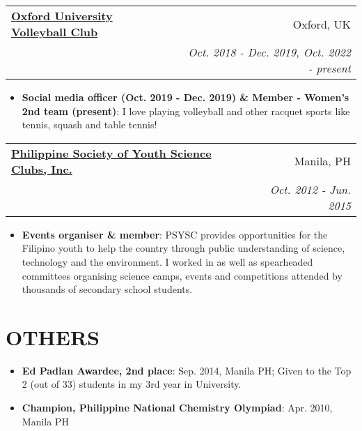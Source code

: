 \documentclass[legalpaper,11pt]{article}
\makeatletter
\newcommand{\resumeItem}[2]{
  \item\small{
    \textbf{#1}{: #2 \vspace{-2pt}}
  }
}
\newcommand{\resumeSubheading}[4]{
  \vspace{-1pt}\item
    \begin{tabular*}{0.97\textwidth}[t]{l@{\extracolsep{\fill}}r}
      \textbf{#1} & #2 \\
      \textit{\small#3} & \textit{\small #4} \\
    \end{tabular*}\vspace{-5pt}
}
\newcommand{\resumeSubItem}[2]{\resumeItem{#1}{#2}\vspace{-4pt}}
\newcommand{\resumeSubHeadingListStart}{\begin{itemize}[leftmargin=*]}
\newcommand{\resumeSubHeadingListEnd}{\end{itemize}}
\newcommand{\resumeItemListStart}{\begin{itemize}}
\newcommand{\resumeItemListEnd}{\end{itemize}\vspace{-5pt}}
\makeatother
\begin{document}
    \resumeSubheading
      {\href{https://ouvc.notion.site/ouvc/OUVC-Homepage-1d969e57c26c4426afc33d509b8736ca}{Oxford University Volleyball Club}}{Oxford, UK}
      {}{Oct. 2018 - Dec. 2019, Oct. 2022 - present}
      \resumeItemListStart
        \resumeItem{Social media officer (Oct. 2019 - Dec. 2019) \& Member - Women's 2nd team (present)}{I love playing volleyball and other racquet sports like tennis, squash and table tennis!}
     \resumeItemListEnd
     
  \resumeSubheading
      {\href{https://psysc.org/}{Philippine Society of Youth Science Clubs, Inc.}}{Manila, PH}
      {}{Oct. 2012 - Jun. 2015}
      \resumeItemListStart
        \resumeItem{Events organiser \& member}{PSYSC provides opportunities for the Filipino youth to help the country through public understanding of science, technology and the environment. I worked in as well as spearheaded committees organising science camps, events and competitions attended by thousands of secondary school students.}
     \resumeItemListEnd



\section{OTHERS}
  \resumeSubHeadingListStart
    \resumeSubItem{Ed Padlan Awardee, 2nd place}{Sep. 2014, Manila PH; Given to the Top 2 (out of 33) students in my 3rd year in University.}
    \resumeSubItem{Champion, Philippine National Chemistry Olympiad}{Apr. 2010, Manila PH}
  \resumeSubHeadingListEnd
  
\end{document}
